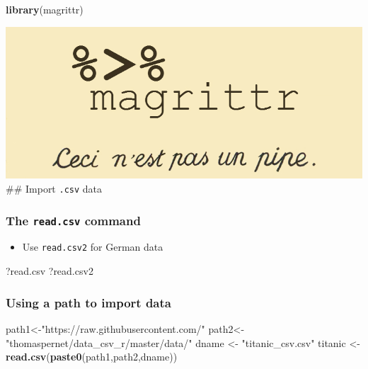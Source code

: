 \documentclass[10pt,]{article}
\newenvironment{Shaded}{\begin{snugshade}}{\end{snugshade}}
\newcommand{\KeywordTok}[1]{\textcolor[rgb]{0.13,0.29,0.53}{\textbf{#1}}}
\newcommand{\StringTok}[1]{\textcolor[rgb]{0.31,0.60,0.02}{#1}}
\newcommand{\NormalTok}[1]{#1}
\providecommand{\tightlist}{%
  \setlength{\itemsep}{0pt}\setlength{\parskip}{0pt}}
\begin{document}
\begin{Shaded}
\begin{Highlighting}[]
\KeywordTok{library}\NormalTok{(magrittr)}
\end{Highlighting}
\end{Shaded}

\includegraphics{figure/magrittr_vignette.jpg} \#\# Import \texttt{.csv}
data

\subsubsection{\texorpdfstring{The \texttt{read.csv}
command}{The read.csv command}}\label{the-read.csv-command}

\begin{itemize}
\tightlist
\item
  Use \texttt{read.csv2} for German data
\end{itemize}

\begin{Shaded}
\begin{Highlighting}[]
\NormalTok{?read.csv}
\NormalTok{?read.csv2}
\end{Highlighting}
\end{Shaded}

\subsubsection{Using a path to import
data}\label{using-a-path-to-import-data}

\begin{Shaded}
\begin{Highlighting}[]
\NormalTok{path1<-}\StringTok{"https://raw.githubusercontent.com/"}
\NormalTok{path2<-}\StringTok{ "thomaspernet/data_csv_r/master/data/"}
\NormalTok{dname <-}\StringTok{ "titanic_csv.csv"}
\NormalTok{titanic <-}\StringTok{ }\KeywordTok{read.csv}\NormalTok{(}\KeywordTok{paste0}\NormalTok{(path1,path2,dname))}
\end{Highlighting}
\end{Shaded}
\end{document}

